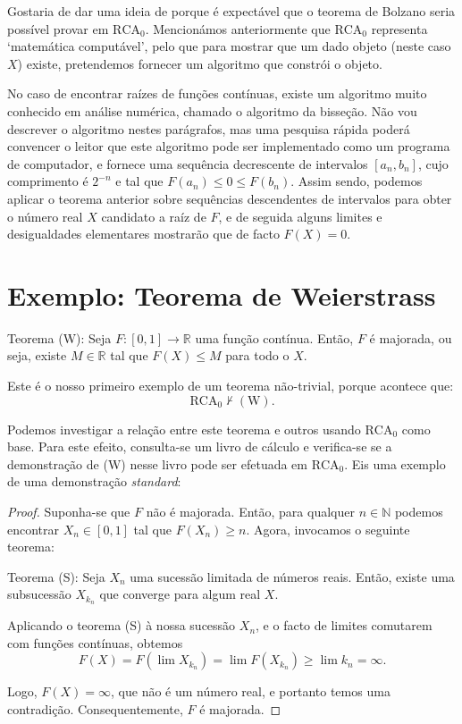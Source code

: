 Gostaria de dar uma ideia de porque é expectável que o teorema de Bolzano seria possível provar em $\mathrm{RCA}_0$. Mencionámos anteriormente que $\mathrm{RCA}_0$ representa `matemática computável', pelo que para mostrar que um dado objeto (neste caso $X$) existe, pretendemos fornecer um algoritmo que constrói o objeto.

No caso de encontrar raízes de funções contínuas, existe um algoritmo muito conhecido em análise numérica, chamado o algoritmo da bisseção. Não vou descrever o algoritmo nestes parágrafos, mas uma pesquisa rápida poderá convencer o leitor que este algoritmo pode ser implementado como um programa de computador, e fornece uma sequência decrescente de intervalos $[a_n, b_n]$, cujo comprimento é $2^{-n}$ e tal que $F(a_n) \leq 0 \leq F(b_n)$. Assim sendo, podemos aplicar o teorema anterior sobre sequências descendentes de intervalos para obter o número real $X$ candidato a raíz de $F$, e de seguida alguns limites e desigualdades elementares mostrarão que de facto $F(X) = 0$.

\section*{Exemplo: Teorema de Weierstrass}

Teorema (W): Seja $F \colon [0,1] \to \mathbb{R}$ uma função contínua. Então, $F$ é majorada, ou seja, existe $M \in \mathbb{R}$ tal que $F(X) \leq M$ para todo o $X$.

Este é o nosso primeiro exemplo de um teorema não-trivial, porque acontece que:
\begin{equation}
\mathrm{RCA}_0 \nvdash (\mathrm{W}).
\end{equation}

Podemos investigar a relação entre este teorema e outros usando $\mathrm{RCA}_0$ como base. Para este efeito, consulta-se um livro de cálculo e verifica-se se a demonstração de (W) nesse livro pode ser efetuada em $\mathrm{RCA}_0$. Eis uma exemplo de uma demonstração \textit{standard}:

\begin{proof}
Suponha-se que $F$ não é majorada. Então, para qualquer $n \in \mathbb{N}$ podemos encontrar $X_n \in [0,1]$ tal que $F(X_n) \geq n$. Agora, invocamos o seguinte teorema:

Teorema (S): Seja $X_n$ uma sucessão limitada de números reais. Então, existe uma subsucessão $X_{k_n}$ que converge para algum real $X$.

Aplicando o teorema (S) à nossa sucessão $X_n$, e o facto de limites comutarem com funções contínuas, obtemos
\begin{equation}
F(X) = F(\lim X_{k_n}) = \lim F(X_{k_n}) \geq \lim k_n = \infty.
\end{equation}

Logo, $F(X) = \infty$, que não é um número real, e portanto temos uma contradição. Consequentemente, $F$ é majorada.
\end{proof}


